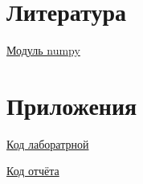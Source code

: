 \documentclass[a4]{article}
\begin{document}
		
		
	\section{Литература}
	
	\href{https://physics.susu.ru/vorontsov/language/numpy.html}{Модуль numpy}
	
	\section{Приложения}
	
	\href{https://github.com/LuciusGen/Matstat/tree/master/Lab2/lab2.py}{Код лаборатрной}
	
	\href{https://github.com/LuciusGen/Matstat/tree/master/Lab2/document.tex}{Код отчёта}
	
\end{document}
